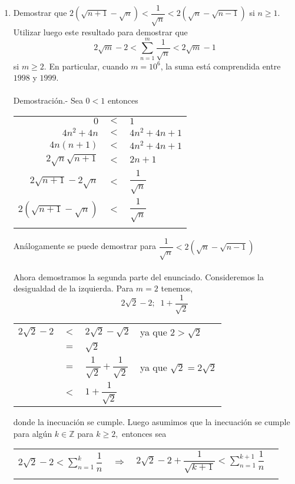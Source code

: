 \begin{enumerate}
\item Demostrar que $2(\sqrt{n+1} - \sqrt{n}) < \dfrac{1}{\sqrt{n}}< 2(\sqrt{n} - \sqrt{n-1})$ si $n\geq 1.$ Utilizar luego este resultado para demostrar que
$$2\sqrt{m} - 2 < \sum\limits_{n=1}^m \dfrac{1}{\sqrt{n}} < 2 \sqrt{m} - 1$$
si $m \geq 2.$ En particular, cuando $m=10^6$, la suma está comprendida entre $1998$ y $1999.$\\\\
Demostración.- \; Sea  $0<1$  entonces 
\begin{center}
\begin{tabular}{r c l}
$0$&$<$&$1$\\
$4n^2 + 4n$&$<$&$4n^2 + 4n + 1$\\
$4n(n+1)$&$<$&$4n^2 + 4n + 1$\\
$2\sqrt{n} \sqrt{n+1}$&$<$&$2n+1$\\
$2\sqrt{n+1} - 2\sqrt{n}$&$<$&$\dfrac{1}{\sqrt{n}}$\\
$2(\sqrt{n+1} - \sqrt{n})$&$<$&$\dfrac{1}{\sqrt{n}}$\\\\
\end{tabular}
\end{center} 
Análogamente se puede demostrar para $\dfrac{1}{\sqrt{n}} < 2(\sqrt{n} - \sqrt{n-1})$\\\\
Ahora demostramos la segunda parte del enunciado. Consideremos la desigualdad de la izquierda. Para $m=2$ tenemos,
$$2\sqrt{2} -2 ; \; \; 1 + \dfrac{1}{\sqrt{2}}$$ 
\begin{center}
\begin{tabular}{r c l l}
$2\sqrt{2} - 2 $&$<$&$2 \sqrt{2} - \sqrt{2}$& ya que $2 > \sqrt{2}$\\
&$=$&$\sqrt{2}$&\\
&$=$&$\dfrac{1}{\sqrt{2}} + \dfrac{1}{\sqrt{2}}$&ya que $\sqrt{2} = 2\sqrt{2}$\\
&$<$&$1 + \dfrac{1}{\sqrt{2}}$&\\
\end{tabular}
\end{center} 
donde la inecuación se cumple. Luego asumimos que la inecuación se cumple para algún $k \in \mathbb{Z}$ para $k\geq 2,$ entonces sea
\begin{center}
\begin{tabular}{r c l l}
$2\sqrt{2} -2 < \sum\limits_{n=1}^k \dfrac{1}{n}$&$\Rightarrow$&$2\sqrt{2} -2 + \dfrac{1}{\sqrt{k+1}}< \sum\limits_{n=1}^{k+1} \dfrac{1}{n}$&\\\\

\end{tabular}
\end{center}
\end{enumerate}
